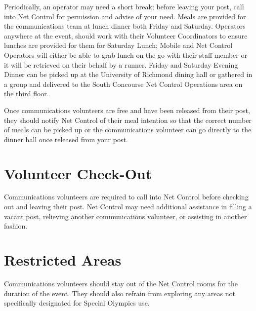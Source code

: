 \documentclass[pdflatex,letterpaper,twoside,12pt]{book}
\begin{document}
Periodically, an operator may need a short break; before leaving your post, call into Net Control for permission and advise of your need.  Meals are provided for the communications team at lunch dinner both Friday and Saturday.  Operators anywhere at the event, should work with their Volunteer Coordinators to ensure lunches are provided for them for Saturday Lunch; Mobile and Net Control Operators will either be able to grab lunch on the go with their staff member or it will be retrieved on their behalf by a runner.  Friday and Saturday Evening Dinner can be picked up at the University of Richmond dining hall or gathered in a group and delivered to the South Concourse Net Control Operations area on the third floor.

Once communications volunteers are free and have been released from their post, they should notify Net Control of their meal intention so that the correct number of meals can be picked up or the communications volunteer can go directly to the dinner hall once released from your post.


\section{Volunteer Check-Out}

Communications volunteers are required to call into Net Control before checking out and leaving their post. Net Control may need additional assistance in filling a vacant post, relieving another communications volunteer, or assisting in another fashion.


\section{Restricted Areas}

Communications volunteers should stay out of the Net Control rooms for the duration of the event. They should also refrain from exploring any areas not specifically designated for Special Olympics use.

\end{document}
